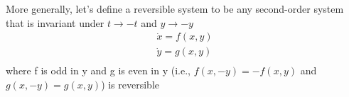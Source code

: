 \documentclass[9pt,aspectratio=43,mathserif,table]{beamer}
\begin{document}
\begin{frame}
	More generally, let’s define a reversible system to be any second-order system that is invariant under $t \rightarrow -t$ and $y \rightarrow -y$
	$$\ $$
	$$
	\begin{array}{c}
		\dot{x}=f\left( x,y \right)\\
		\dot{y}=g\left( x,y \right)\\
	\end{array}
	$$
	$$\ $$
	where f is odd in y and g is even in y (i.e., $f ( x, -y ) = -f ( x, y )$ and $g ( x, -y ) = g ( x, y )$) is reversible
\end{frame}
\end{document}
